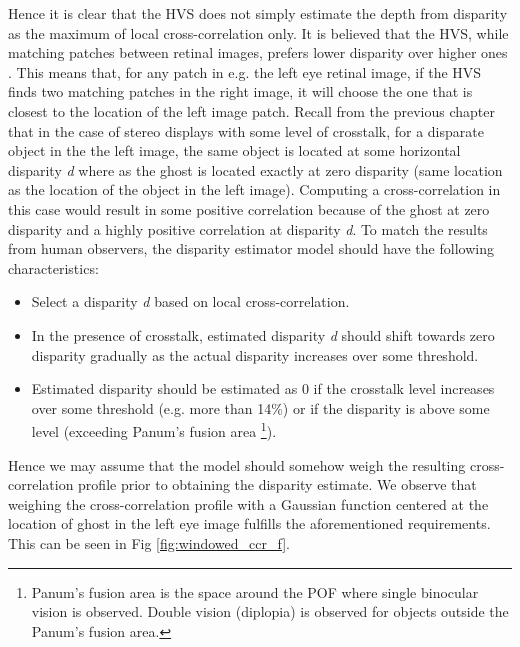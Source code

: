 Hence it is clear that the HVS does not simply estimate the depth from disparity as the maximum of local cross-correlation only. It is believed that the HVS, while matching patches between retinal images, prefers lower disparity over higher ones \cite{howard1995binocular}. This means that, for any patch in e.g. the left eye retinal image, if the HVS finds two matching patches in the right image, it will choose the one that is closest to the location of the left image patch. Recall from the previous chapter that in the case of stereo displays with some level of crosstalk, for a disparate object in the the left image, the same object is located at some horizontal disparity \emph{d} where as the ghost is located exactly at zero disparity (same location as the location of the object in the left image). Computing a cross-correlation in this case would result in some positive correlation because of the ghost at zero disparity and a highly positive correlation at disparity \emph{d}. To match the results from human observers, the disparity estimator model should have the following characteristics:
\begin{itemize}
\item{Select a disparity \emph{d} based on local cross-correlation.}
\item{In the presence of crosstalk, estimated disparity \emph{d} should shift towards zero disparity gradually as the actual disparity increases over some threshold.}
\item{Estimated disparity should be estimated as 0 if the crosstalk level increases over some threshold (e.g. more than 14\%) or if the disparity is above some level (exceeding Panum's fusion area \footnote{Panum's fusion area is the space around the POF where single binocular vision is observed. Double vision (diplopia) is observed for objects outside the Panum's fusion area.}).}
\end{itemize}
Hence we may assume that the model should somehow weigh the resulting cross-correlation profile prior to obtaining the disparity estimate. We observe that weighing the cross-correlation profile with a Gaussian function centered at the location of ghost in the left eye image fulfills the aforementioned requirements. This can be seen in Fig \ref{fig:windowed_ccr_f}.
